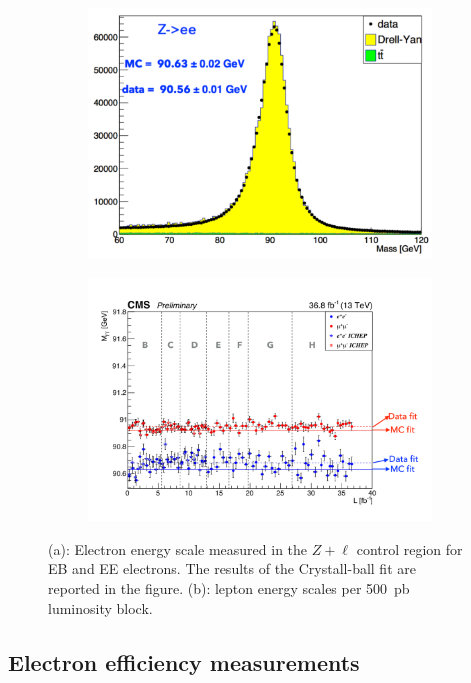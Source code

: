 \begin{figure}[tbh]
\centering
\begin{subfigure}{0.9\textwidth}
\centering
\includegraphics[width=4in]{Figures/Electrons/ele_energy_scale.pdf}
\caption{}
\end{subfigure}
\begin{subfigure}{0.9\textwidth}
\centering
\includegraphics[width=4.5in]{Figures/Electrons/ele_energy_scale_per_lumi.pdf}
\caption{}
\end{subfigure}
\caption{(a): Electron energy scale measured in the $Z+\ell$ control region for EB and EE electrons. The results of the Crystall-ball fit are reported in the figure. (b): lepton energy scales per 500~pb luminosity block.}
\label{fig:ele_energy_scale}
\end{figure}

\subsection{Electron efficiency measurements}
\label{sec:eleEffMeas}
%


